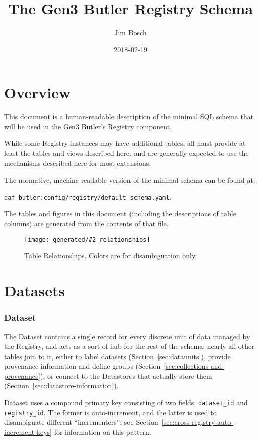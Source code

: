 \documentclass[DM,toc]{lsstdoc}
\title{The Gen3 Butler Registry Schema}
\author{Jim Bosch}
\date{2018-02-19}
\newcommand{\relgraph}[3][width=0.8\textwidth]{
    \begin{figure}
        \centering
        \texttt{[image: generated/\#2\_relationships]}
        \caption{#3}
        \label{rel:#2}
    \end{figure}
}
\begin{document}
\maketitle

\section{Overview}
\label{sec:overview}

This document is a human-readable description of the minimal SQL schema that will be used in the Gen3 Butler's Registry component.

While some Registry instances may have additional tables, all must provide at least the tables and views described here, and are generally expected to use the mechanisms described here for most extensions.

The normative, machine-readable version of the minimal schema can be found at:

\verb`daf_butler:config/registry/default_schema.yaml`.

The tables and figures in this document (including the descriptions of table columns) are generated from the contents of that file.

\relgraph[height=0.9\textheight]{All}{
    Table Relationships.  Colors are for disambiguation only.
}

\section{Datasets}
\label{sec:datasets}

\subsubsection{Dataset}
\label{sec:dataset}

The Dataset contains a single record for every discrete unit of data managed by the Registry, and acts as a sort of hub for the rest of the schema: nearly all other tables join to it, either to label datasets (Section~\ref{sec:dataunits}), provide provenance information and define groups (Section~\ref{sec:collections-and-provenance}), or connect to the Datastores that actually store them (Section~\ref{sec:datastore-information}).

Dataset uses a compound primary key consisting of two fields, \texttt{dataset\_id} and \texttt{registry\_id}.
The former is auto-increment, and the latter is used to disambiguate different ``incrementers''; see Section~\ref{sec:cross-registry-auto-increment-keys} for information on this pattern.
\end{document}

